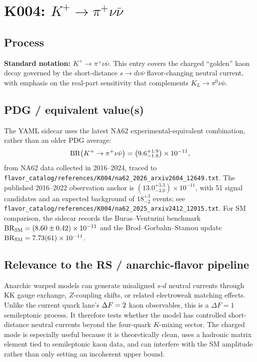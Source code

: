
\section{K004: \(K^+ \to \pi^+ \nu\bar{\nu}\)}

\subsection*{Process}
\textbf{Standard notation:} \(K^+ \to \pi^+ \nu\bar{\nu}\).  This entry
covers the charged ``golden'' kaon decay governed by the short-distance
\(s\to d\nu\bar{\nu}\) flavor-changing neutral current, with emphasis on the
real-part sensitivity that complements \(K_L\to\pi^0\nu\bar{\nu}\).

\subsection*{PDG / equivalent value(s)}
The YAML sidecar uses the latest NA62 experimental-equivalent combination,
rather than an older PDG average:
\[
  \operatorname{BR}\!\left(K^+ \to \pi^+ \nu\bar{\nu}\right)
  = \left(9.6^{+1.9}_{-1.8}\right)\times 10^{-11},
\]
from NA62 data collected in 2016--2024, traced to
\texttt{flavor\_catalog/references/K004/na62\_2026\_arxiv2604\_12649.txt}.
The published 2016--2022 observation anchor is
\(\left(13.0^{+3.3}_{-3.0}\right)\times 10^{-11}\), with 51 signal candidates
and an expected background of \(18^{+3}_{-2}\) events; see
\texttt{flavor\_catalog/references/K004/na62\_2025\_arxiv2412\_12015.txt}.
For SM comparison, the sidecar records the Buras--Venturini benchmark
\(\operatorname{BR}_{\rm SM}=\left(8.60\pm0.42\right)\times10^{-11}\) and the
Brod--Gorbahn--Stamou update
\(\operatorname{BR}_{\rm SM}=7.73(61)\times10^{-11}\).

\subsection*{Relevance to the RS / anarchic-flavor pipeline}
Anarchic warped models can generate misaligned \(s\)-\(d\) neutral currents
through KK gauge exchange, \(Z\)-coupling shifts, or related electroweak
matching effects.  Unlike the current quark lane's \(\Delta F=2\) kaon
observables, this is a \(\Delta F=1\) semileptonic process.  It therefore
tests whether the model has controlled short-distance neutral currents beyond
the four-quark \(K\)-mixing sector.  The charged mode is especially useful
because it is theoretically clean, uses a hadronic matrix element tied to
semileptonic kaon data, and can interfere with the SM amplitude rather than
only setting an incoherent upper bound.

